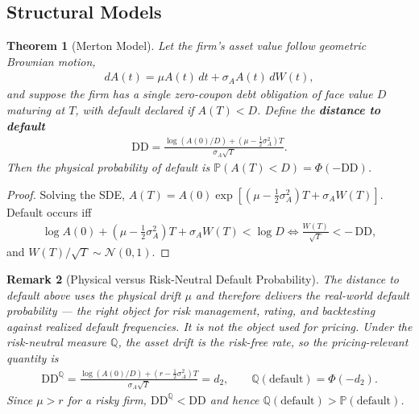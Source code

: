\documentclass{report}
\theoremstyle{spacedplain}
\newtheorem{theorem}{Theorem}[section]
\theoremstyle{spaceddefinition}
\theoremstyle{spacedremark}
\newtheorem{remark}[theorem]{Remark}
\begin{document}
\subsection{Structural Models}

\begin{theorem}[Merton Model]
Let the firm's asset value follow geometric Brownian motion,
\begin{align}
    dA(t) = \mu A(t)\,dt + \sigma_A A(t)\,dW(t),
\end{align}
and suppose the firm has a single zero-coupon debt obligation of face value $D$ maturing at $T$, with default declared if $A(T) < D$. Define the \textbf{distance to default}
\begin{align}
    \mathrm{DD} = \frac{\log(A(0)/D) + \left(\mu - \tfrac{1}{2}\sigma_A^2\right)T}{\sigma_A\sqrt{T}}.
\end{align}
Then the \emph{physical} probability of default is $\mathbb{P}(A(T) < D) = \Phi(-\mathrm{DD})$.
\end{theorem}
\begin{proof}
    Solving the SDE, $A(T) = A(0)\exp\left[(\mu - \tfrac12\sigma_A^2)T + \sigma_A W(T)\right]$. Default occurs iff
    \begin{align}
        \log A(0) + (\mu-\tfrac12\sigma_A^2)T + \sigma_A W(T) < \log D
        \iff \frac{W(T)}{\sqrt{T}} < -\,\mathrm{DD},
    \end{align}
    and $W(T)/\sqrt{T}\sim\mathcal{N}(0,1)$.
\end{proof}

\begin{remark}[Physical versus Risk-Neutral Default Probability]
    The distance to default above uses the \emph{physical} drift $\mu$ and therefore delivers the real-world default probability --- the right object for risk management, rating, and backtesting against realized default frequencies. It is \emph{not} the object used for pricing. Under the risk-neutral measure $\mathbb{Q}$, the asset drift is the risk-free rate, so the pricing-relevant quantity is
    \begin{align}
        \mathrm{DD}^{\mathbb{Q}} = \frac{\log(A(0)/D) + \left(r - \tfrac{1}{2}\sigma_A^2\right)T}{\sigma_A\sqrt{T}} = d_2, \qquad \mathbb{Q}(\text{default}) = \Phi(-d_2).
    \end{align}
    Since $\mu > r$ for a risky firm, $\mathrm{DD}^{\mathbb{Q}} < \mathrm{DD}$ and hence $\mathbb{Q}(\text{default}) > \mathbb{P}(\text{default})$.
\end{remark}
\end{document}
